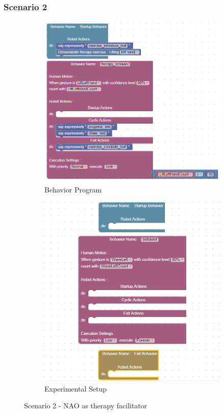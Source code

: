 \documentclass{llncs}
\begin{document}
\subsubsection{Scenario 2}%
\begin{figure}
\centering
\begin{subfigure}[t]{0.48\textwidth}
\includegraphics[width=\textwidth]{../thesis/assets/scenario2.png}
\caption[Behavior Program]{Behavior Program}
\label{fig:scenario2_program}
\end{subfigure}
\begin{subfigure}[t]{0.48\textwidth}
\includegraphics[width=\textwidth]{../thesis/assets/program_block.png}
\caption[Block Implementation]{Experimental Setup}
\label{fig:scenario2_setup}
\end{subfigure}
\caption[Program Structure]{Scenario 2 - NAO as therapy facilitator}
\label{fig:program}
\end{figure}
\end{document}
